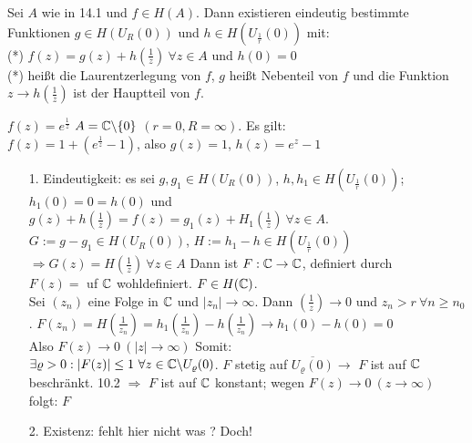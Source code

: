 \documentclass[a4paper,twoside,DIV15,BCOR12mm]{scrbook}
\begin{document}
\begin{satz} [Laurententwicklung]
  Sei $A$ wie in 14.1 und $f \in H(A)$. Dann existieren eindeutig bestimmte Funktionen $g \in H(U_R(0))$ und $h \in H(U_{\frac{1}{r}}(0))$ mit: \\
  (*) $f(z) = g(z) + h(\frac{1}{z})\ \forall z \in A$ und $h(0) = 0$ \\
  (*) heißt die Laurentzerlegung von $f$, $g$ heißt Nebenteil von $f$ und die Funktion $ z \rightarrow h(\frac{1}{z})$ ist der Hauptteil von $f$. 
\end{satz}

\begin{beispiel}
  $f(z) = e^{\frac{1}{z}}$ $A = \mathbb{C} \backslash \{0\}$ $(r = 0, R = \infty)$. Es gilt: \\
  $f(z) = 1 + (  e^{\frac{1}{z}} - 1 )$, also $g(z) = 1$, $h(z) = e^z -1 $
\end{beispiel}

\begin{beweis}
  \begin{itemize}
    \item[ 1. ] Eindeutigkeit: es sei $g, g_1 \in H(U_R(0))$, $h, h_1 \in H(U_{\frac{1}{r}}(0))$;
	$h_1(0) = 0 = h(0)$ und $g(z) + h(\frac{1}{z}) = f(z) = g_1(z) + H_1(\frac{1}{z})\ \forall z \in A$.\\
	$G := g - g_1 \in H(U_R(0))$, $H:= h_1 - h \in  H(U_{\frac{1}{r}}(0))$ \\
	$\Rightarrow G(z) = H(\frac{1}{z}) \ \forall z \in A$
	Dann ist $F:\mathbb{C} \rightarrow \mathbb{C}$, definiert durch \\
	$F(z) = $ uf $\mathbb{C}$ wohldefiniert. $F \in H(\mathbb{C})$. \\
	Sei $(z_n)$ eine Folge in $\mathbb{C}$ und $|z_n| \rightarrow \infty$. Dann $(\frac{1}{z}) \rightarrow 0$ und
	$z_n > r \ \forall n \ge n_0$. $F(z_n) = H(\frac{1}{z_n}) = h_1(\frac{1}{z_n}) - h(\frac{1}{z_n}) \rightarrow h_1(0) - h(0) = 0$\\
	Also $F(z) \rightarrow 0 \ (|z| \rightarrow \infty)$ Somit: \\
	$\exists \varrho > 0: |F(z)| \le 1 \ \forall z \in \MdC \backslash U_{\varrho}(0)$. $F$ stetig auf $ \overline{U_{\varrho}(0)} \rightarrow$
	$F$ ist auf $\mathbb{C}$ beschränkt. 10.2 $\Rightarrow$ $F$ ist auf $\mathbb{C}$ konstant; wegen 
	$F(z) \rightarrow 0 \ (z \rightarrow \infty)$ folgt: $F$ %
    \item[ 2. ] Existenz: fehlt hier nicht was ? Doch! 
  \end{itemize}
\end{beweis}
\end{document}
